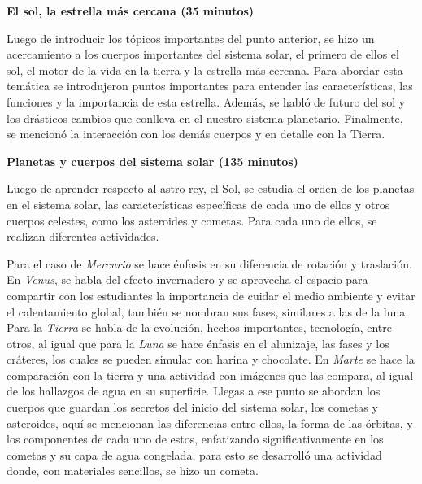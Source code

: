 \documentclass[a4paper,10pt]{article}
\begin{document}
\vspace{2mm}

\noindent \textbf{El sol, la estrella más cercana (35 minutos)}
\vspace{2mm}

\noindent Luego de introducir los tópicos importantes del punto anterior, se hizo un acercamiento a los cuerpos importantes del sistema solar, el primero de ellos el sol, el motor de la vida en la tierra y la estrella más cercana. Para abordar esta temática se introdujeron puntos importantes para entender las características, las funciones y la importancia de esta estrella. Además, se habló de futuro del sol y los drásticos cambios que conlleva en el nuestro sistema planetario. Finalmente, se mencionó la interacción con los demás cuerpos y en detalle con la Tierra. 

\vspace{2mm}

\noindent \textbf{Planetas y cuerpos del sistema solar (135 minutos)}

\vspace{2mm}

\noindent Luego de aprender respecto al astro rey, el Sol, se estudia el orden de los planetas en el sistema solar, las características específicas de cada uno de ellos y otros cuerpos celestes, como los asteroides y cometas. Para cada uno de ellos, se realizan diferentes actividades. 

\vspace{2mm}

\noindent Para el caso de \textit{Mercurio} se hace énfasis en su diferencia de rotación y traslación. En \textit{Venus}, se habla del efecto invernadero y se aprovecha el espacio para compartir con los estudiantes la importancia de cuidar el medio ambiente y evitar el calentamiento global, también se nombran sus fases, similares a las de la luna. Para la \textit{Tierra} se habla de la evolución, hechos importantes, tecnología, entre otros, al igual que para la \textit{Luna} se hace énfasis en el alunizaje, las fases y los cráteres, los cuales se pueden simular con harina y chocolate. En  \textit{Marte} se hace la comparación con la tierra y una actividad con imágenes que las compara, al igual de los hallazgos de agua en su superficie. Llegas a ese punto se abordan los cuerpos que guardan los secretos del inicio del sistema solar, los cometas y asteroides, aquí se mencionan las diferencias entre ellos, la forma de las órbitas, y los componentes de cada uno de estos, enfatizando significativamente en los cometas y su capa de agua congelada, para esto se desarrolló una actividad donde, con materiales sencillos, se hizo un cometa.\\
\end{document}
